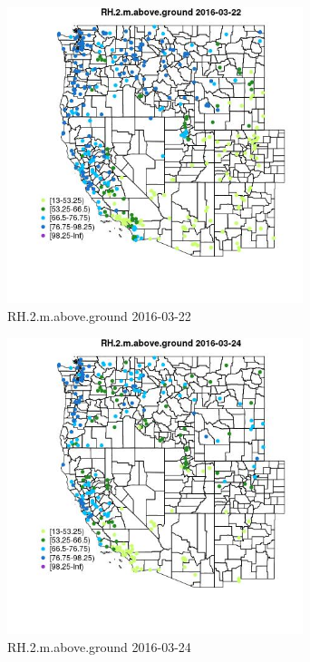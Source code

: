 \begin{figure} 
\centering  
\includegraphics[width=0.77\textwidth]{Code_Outputs/Report_ML_input_PM25_Step4_part_e_de_duplicated_aveswNAs_MapObsRH2maboveground2016-03-22.jpg} 
\caption{\label{fig:Report_ML_input_PM25_Step4_part_e_de_duplicated_aveswNAsMapObsRH2maboveground2016-03-22}RH.2.m.above.ground 2016-03-22} 
\end{figure} 
 

\begin{figure} 
\centering  
\includegraphics[width=0.77\textwidth]{Code_Outputs/Report_ML_input_PM25_Step4_part_e_de_duplicated_aveswNAs_MapObsRH2maboveground2016-03-24.jpg} 
\caption{\label{fig:Report_ML_input_PM25_Step4_part_e_de_duplicated_aveswNAsMapObsRH2maboveground2016-03-24}RH.2.m.above.ground 2016-03-24} 
\end{figure} 
 

